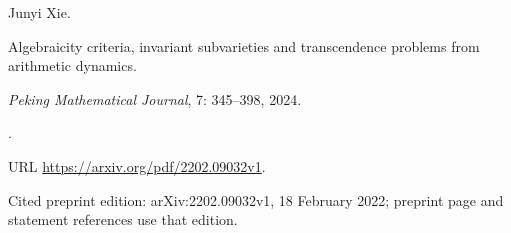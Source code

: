 Junyi Xie.

\newblock Algebraicity criteria, invariant subvarieties and transcendence
  problems from arithmetic dynamics.

\newblock \emph{Peking Mathematical Journal}, 7: 345--398, 2024.

\newblock {}.

\newblock URL \url{https://arxiv.org/pdf/2202.09032v1}.

\newblock Cited preprint edition: arXiv:2202.09032v1, 18 February 2022; preprint page and statement references use that edition.
